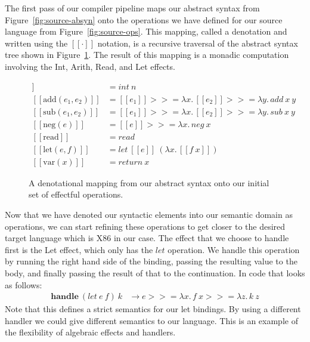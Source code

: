 \documentclass[a4paper,UKenglish,cleveref, autoref, thm-restate]{oasics-v2021}
\newcommand\bind[1]{>\!\!>\!\!= \lambda #1.\,}
\begin{document}
The first pass of our compiler pipeline maps our abstract syntax from Figure~\ref{fig:source-absyn} onto the operations we have defined for our source language from Figure~\ref{fig:source-ops}.
This mapping, called a denotation and written using the $[\![ \cdot ]\!]$ notation, is a recursive traversal of the abstract syntax tree shown in Figure~\ref{fig:den}.
The result of this mapping is a monadic computation involving the Int, Arith, Read, and Let effects.

\begin{figure}[ht]
\begin{align*}
  [\![ \mathrm{int}(n) ]\!] & = \mathit{int}~n \\
  [\![ \mathrm{add}(e_1, e_2) ]\!] & = [\![ e_1 ]\!] \bind{x} [\![ e_2 ]\!] \bind{y} \mathit{add}~x~y \\
  [\![ \mathrm{sub}(e_1, e_2) ]\!] & = [\![ e_1 ]\!] \bind{x} [\![ e_2 ]\!] \bind{y} \mathit{sub}~x~y \\
  [\![ \mathrm{neg}(e) ]\!] & = [\![ e ]\!] \bind{x} \mathit{neg}~x \\
  [\![ \mathrm{read} ]\!] & = \mathit{read} \\
  [\![ \mathrm{let}(e,f) ]\!] & = \mathit{let}~[\![e]\!]~(\lambda x.\, [\![ f~x ]\!]) \\
  [\![ \mathrm{var}(x) ]\!] & = \mathit{return}~x
\end{align*}
  \caption{A denotational mapping from our abstract syntax onto our initial set of effectful operations.}\label{fig:den}
\end{figure}

Now that we have denoted our syntactic elements into our semantic domain as operations, we can start refining these operations to get closer to the desired target language which is X86 in our case.
The effect that we choose to handle first is the Let effect, which only has the $\mathit{let}$ operation.
We handle this operation by running the right hand side of the binding, passing the resulting value to the body, and finally passing the result of that to the continuation. In code that looks as follows:
\begin{align*}
  \mathbf{handle}~(\mathit{let}~e~f)~k & \to e \bind{x} f~x \bind{z} k~z
\end{align*}
Note that this defines a strict semantics for our let bindings.
By using a different handler we could give different semantics to our language.
This is an example of the flexibility of algebraic effects and handlers.
\end{document}
